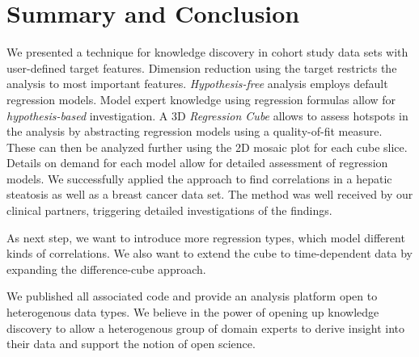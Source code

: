 \documentclass[journal]{style/vgtc} 			          %
\begin{document}
\section{Summary and Conclusion}
We presented a technique for knowledge discovery in cohort study data sets with user-defined target features.
Dimension reduction using the target restricts the analysis to most important features.
\emph{Hypothesis-free} analysis employs default regression models.
Model expert knowledge using regression formulas allow for \emph{hypothesis-based} investigation.
A 3D \emph{Regression Cube} allows to assess hotspots in the analysis by abstracting regression models using a quality-of-fit measure.
These can then be analyzed further using the 2D mosaic plot for each cube slice.
Details on demand for each model allow for detailed assessment of regression models.
We successfully applied the approach to find correlations in a hepatic steatosis as well as a breast cancer data set.
The method was well received by our clinical partners, triggering detailed investigations of the findings.

As next step, we want to introduce more regression types, which model different kinds of correlations.
We also want to extend the cube to time-dependent data by expanding the difference-cube approach.

We published all associated code and provide an analysis platform open to heterogenous data types.
We believe in the power of opening up knowledge discovery to allow a heterogenous group of domain experts to derive insight into their data and support the notion of open science.
\end{document}
